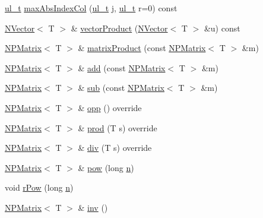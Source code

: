 \begin{DoxyCompactItemize}
\item 
\mbox{\hyperlink{group___n_algebra_ga1b140a2034db3f5dfe18a987745df43a}{ul\+\_\+t}} \mbox{\hyperlink{class_n_p_matrix_a2b5a2c3d646df900367ad91450d1ef33}{max\+Abs\+Index\+Col}} (\mbox{\hyperlink{group___n_algebra_ga1b140a2034db3f5dfe18a987745df43a}{ul\+\_\+t}} j, \mbox{\hyperlink{group___n_algebra_ga1b140a2034db3f5dfe18a987745df43a}{ul\+\_\+t}} r=0) const
\item 
\mbox{\hyperlink{class_n_vector}{N\+Vector}}$<$ T $>$ \& \mbox{\hyperlink{class_n_p_matrix_a8bb14c131409b94a8b52ec6a932098e5}{vector\+Product}} (\mbox{\hyperlink{class_n_vector}{N\+Vector}}$<$ T $>$ \&u) const
\item 
\mbox{\hyperlink{class_n_p_matrix}{N\+P\+Matrix}}$<$ T $>$ \& \mbox{\hyperlink{class_n_p_matrix_a79dfadc3945a91d9083af8da34b7412f}{matrix\+Product}} (const \mbox{\hyperlink{class_n_p_matrix}{N\+P\+Matrix}}$<$ T $>$ \&m)
\item 
\mbox{\hyperlink{class_n_p_matrix}{N\+P\+Matrix}}$<$ T $>$ \& \mbox{\hyperlink{class_n_p_matrix_a3f15ce97eeb7ddedac0741a5bdcf95c7}{add}} (const \mbox{\hyperlink{class_n_p_matrix}{N\+P\+Matrix}}$<$ T $>$ \&m)
\item 
\mbox{\hyperlink{class_n_p_matrix}{N\+P\+Matrix}}$<$ T $>$ \& \mbox{\hyperlink{class_n_p_matrix_adbaf5fc3417b46834bfb5392db7ef92b}{sub}} (const \mbox{\hyperlink{class_n_p_matrix}{N\+P\+Matrix}}$<$ T $>$ \&m)
\item 
\mbox{\hyperlink{class_n_p_matrix}{N\+P\+Matrix}}$<$ T $>$ \& \mbox{\hyperlink{class_n_p_matrix_a9b38999d88043fa71686351ded183de8}{opp}} () override
\item 
\mbox{\hyperlink{class_n_p_matrix}{N\+P\+Matrix}}$<$ T $>$ \& \mbox{\hyperlink{class_n_p_matrix_adb7ad767393a1fc0d240e1bb0c73b1f4}{prod}} (T s) override
\item 
\mbox{\hyperlink{class_n_p_matrix}{N\+P\+Matrix}}$<$ T $>$ \& \mbox{\hyperlink{class_n_p_matrix_a24b3fd013f74fdbde91f89095e9ca584}{div}} (T s) override
\item 
\mbox{\hyperlink{class_n_p_matrix}{N\+P\+Matrix}}$<$ T $>$ \& \mbox{\hyperlink{class_n_p_matrix_ab131f8f10f6ab2aa9d9ca6467f0ffbf5}{pow}} (long \mbox{\hyperlink{class_n_p_matrix_afc181b7652d9427125c72c38d7c1498d}{n}})
\item 
void \mbox{\hyperlink{class_n_p_matrix_acd64a88eccd7644ff34a0f42e4313b09}{r\+Pow}} (long \mbox{\hyperlink{class_n_p_matrix_afc181b7652d9427125c72c38d7c1498d}{n}})
\item 
\mbox{\hyperlink{class_n_p_matrix}{N\+P\+Matrix}}$<$ T $>$ \& \mbox{\hyperlink{class_n_p_matrix_ac672c69c4b0ec298ac3e8326fcce48cb}{inv}} ()

\end{DoxyCompactItemize}

